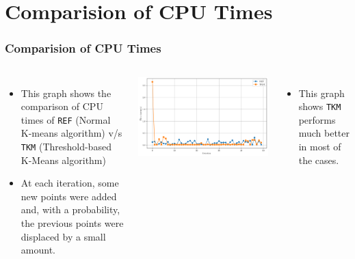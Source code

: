 \documentclass{beamer}
\begin{document}
\section{Comparision of CPU Times}
\begin{frame}
  \frametitle{Comparision of CPU Times}

  \begin{columns}

    \begin{itemize}
      \item This graph shows the comparison of CPU times of \texttt{REF} (Normal K-means algorithm) v/s \texttt{TKM} (Threshold-based K-Means algorithm)
      \item At each iteration, some new points were added and, with a probability, the previous points were displaced by a small amount.


    \end{itemize}

    \includegraphics[width=1\textwidth]{Diff.png}
    \begin{itemize}
      \vspace{-0.2cm}
      \item \small This graph shows \texttt{TKM} performs much better in most of the cases.
    \end{itemize}
  \end{columns}
\end{frame}
\end{document}
